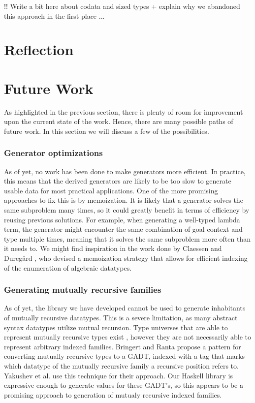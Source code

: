 \documentclass[a4paper,msc,twosized=semi]{uustthesis}
\begin{document}
  !! Write a bit here about codata and sized types + explain why we abandoned this 
  approach in the first place ... 

\section{Reflection}

\section{Future Work}

  As highlighted in the previous section, there is plenty of room for improvement upon 
  the current state of the work. Hence, there are many possible paths of future work. 
  In this section we will discuss a few of the possibilities. 

\subsubsection{Generator optimizations}

  As of yet, no work has been done to make generators more efficient. In practice, 
  this means that the derived generators are likely to be too slow to generate usable 
  data for most practical applications. One of the more promising approaches to fix 
  this is by memoization. It is likely that a generator solves the same subproblem 
  many times, so it could greatly benefit in terms of efficiency by reusing previous 
  solutions. For example, when generating a well-typed lambda term, the generator 
  might encounter the same combination of goal context and type multiple times, 
  meaning that it solves the same subproblem more often than it needs to. We might 
  find inspiration in the work done by Claessen and Dureg{\aa}rd \cite
  {duregaard2013feat}, who devised a memoization strategy that allows for efficient 
  indexing of the enumeration of algebraic datatypes. 

\subsubsection{Generating mutually recursive families}

  As of yet, the library we have developed cannot be used to generate inhabitants of 
  mutually recursive datatypes. This is a severe limitation, as many abstract syntax 
  datatypes utilize mutual recursion. Type universes that are able to represent 
  mutually recursive types exist \cite{miraldo2018sums , yakushev2009generic}, however 
  they are not necessarily able to represent arbitrary indexed families. Bringert and 
  Ranta \cite{bringert2006pattern} propose a pattern for converting mutually recursive 
  types to a GADT, indexed with a tag that marks which datatype of the mutually 
  recursive family a recursive position refers to. Yakushev et al. \cite
  {yakushev2009generic} use this technique for their approach. Our Haskell library is 
  expressive enough to generate values for these GADT's, so this appears to be a 
  promising approach to generation of mutualy recursive indexed families. 
\end{document}
